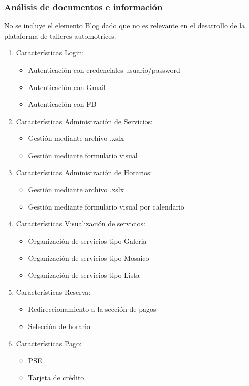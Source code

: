 \documentclass[10pt,a4paper,openany]{book}
\begin{document}
\subsubsection{Análisis de documentos e información}
No se incluye el elemento Blog dado que no es relevante en el desarrollo de la plataforma de talleres automotrices.
\begin{enumerate}
\item Características Login:
	\begin{itemize}
	\item Autenticación con credenciales usuario/password
	\item Autenticación con Gmail
	\item Autenticación con FB
	\end{itemize}
\item Características Administración de Servicios:
	\begin{itemize}
	\item Gestión mediante archivo .xslx
	\item Gestión mediante formulario visual
	\end{itemize}
\item Características Administración de Horarios:
	\begin{itemize}
	\item Gestión mediante archivo .xslx
	\item Gestión mediante formulario visual por calendario
	\end{itemize}
\item Características  Visualización de servicios:
	\begin{itemize}
	\item Organización de servicios tipo Galeria
	\item Organización de servicios tipo Mosaico
	\item Organización de servicios tipo Lista
	\end{itemize}
\item Características Reserva:
	\begin{itemize}
	\item Redireccionamiento a la sección de pagos
	\item Selección de horario
	\end{itemize}
\item Características Pago:
	\begin{itemize}
	\item PSE
	\item Tarjeta de crédito
	\end{itemize}

\end{enumerate}
\end{document}
